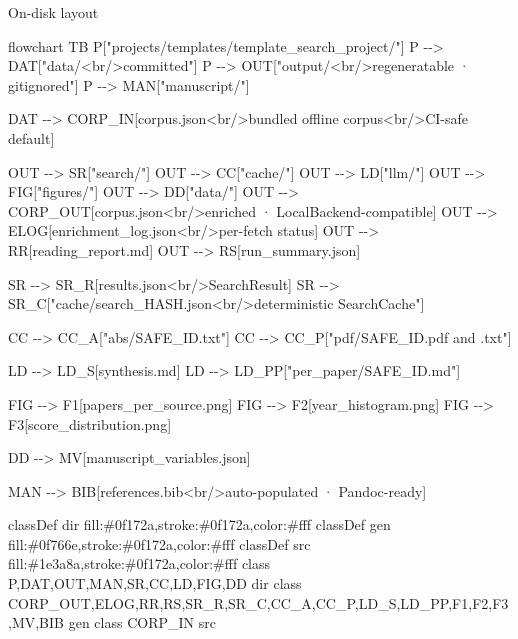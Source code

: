 \documentclass[
  ignorenonframetext,
]{beamer}
\newenvironment{Shaded}{}{}
\newcommand{\NormalTok}[1]{#1}
\begin{document}
\begin{frame}{On-disk layout}
\begin{Shaded}
\begin{Highlighting}[]
\NormalTok{flowchart TB}
\NormalTok{    P["projects/templates/template\_search\_project/"]}
\NormalTok{    P {-}{-}\textgreater{} DAT["data/\textless{}br/\textgreater{}committed"]}
\NormalTok{    P {-}{-}\textgreater{} OUT["output/\textless{}br/\textgreater{}regeneratable · gitignored"]}
\NormalTok{    P {-}{-}\textgreater{} MAN["manuscript/"]}

\NormalTok{    DAT {-}{-}\textgreater{} CORP\_IN[corpus.json\textless{}br/\textgreater{}bundled offline corpus\textless{}br/\textgreater{}CI{-}safe default]}

\NormalTok{    OUT {-}{-}\textgreater{} SR["search/"]}
\NormalTok{    OUT {-}{-}\textgreater{} CC["cache/"]}
\NormalTok{    OUT {-}{-}\textgreater{} LD["llm/"]}
\NormalTok{    OUT {-}{-}\textgreater{} FIG["figures/"]}
\NormalTok{    OUT {-}{-}\textgreater{} DD["data/"]}
\NormalTok{    OUT {-}{-}\textgreater{} CORP\_OUT[corpus.json\textless{}br/\textgreater{}enriched · LocalBackend{-}compatible]}
\NormalTok{    OUT {-}{-}\textgreater{} ELOG[enrichment\_log.json\textless{}br/\textgreater{}per{-}fetch status]}
\NormalTok{    OUT {-}{-}\textgreater{} RR[reading\_report.md]}
\NormalTok{    OUT {-}{-}\textgreater{} RS[run\_summary.json]}

\NormalTok{    SR {-}{-}\textgreater{} SR\_R[results.json\textless{}br/\textgreater{}SearchResult]}
\NormalTok{    SR {-}{-}\textgreater{} SR\_C["cache/search\_HASH.json\textless{}br/\textgreater{}deterministic SearchCache"]}

\NormalTok{    CC {-}{-}\textgreater{} CC\_A["abs/SAFE\_ID.txt"]}
\NormalTok{    CC {-}{-}\textgreater{} CC\_P["pdf/SAFE\_ID.pdf and .txt"]}

\NormalTok{    LD {-}{-}\textgreater{} LD\_S[synthesis.md]}
\NormalTok{    LD {-}{-}\textgreater{} LD\_PP["per\_paper/SAFE\_ID.md"]}

\NormalTok{    FIG {-}{-}\textgreater{} F1[papers\_per\_source.png]}
\NormalTok{    FIG {-}{-}\textgreater{} F2[year\_histogram.png]}
\NormalTok{    FIG {-}{-}\textgreater{} F3[score\_distribution.png]}

\NormalTok{    DD {-}{-}\textgreater{} MV[manuscript\_variables.json]}

\NormalTok{    MAN {-}{-}\textgreater{} BIB[references.bib\textless{}br/\textgreater{}auto{-}populated · Pandoc{-}ready]}

\NormalTok{    classDef dir fill:\#0f172a,stroke:\#0f172a,color:\#fff}
\NormalTok{    classDef gen fill:\#0f766e,stroke:\#0f172a,color:\#fff}
\NormalTok{    classDef src fill:\#1e3a8a,stroke:\#0f172a,color:\#fff}
\NormalTok{    class P,DAT,OUT,MAN,SR,CC,LD,FIG,DD dir}
\NormalTok{    class CORP\_OUT,ELOG,RR,RS,SR\_R,SR\_C,CC\_A,CC\_P,LD\_S,LD\_PP,F1,F2,F3,MV,BIB gen}
\NormalTok{    class CORP\_IN src}
\end{Highlighting}
\end{Shaded}
\end{frame}
\end{document}
